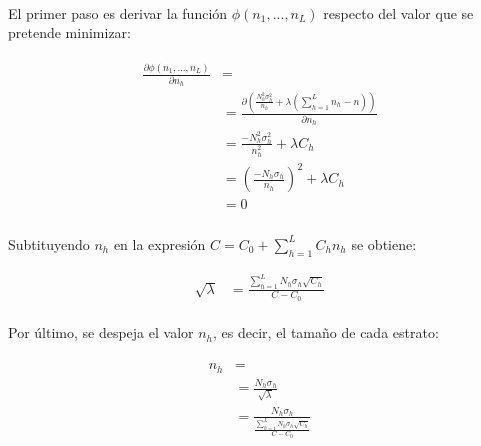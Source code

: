 \documentclass{article}
\begin{document}
      \paragraph{}
      El primer paso es derivar la función $\phi(n_1, ..., n_L)$ respecto del valor que se pretende minimizar:

      \begin{align}
      \label{eq:derivate_2}
        \begin{split}
          \frac{\partial \phi(n_1, ..., n_L)}{\partial n_h} &= \\
          &= \frac{\partial\left( \frac{N_h^2 \sigma_h^{2}}{n_h}
          + \lambda \left( \sum_{h=1}^L n_h - n\right)\right) }{\partial n_h} \\
          &= \frac{-N_h^2 \sigma_h^{2}}{n_h^2} +\lambda C_h\\
          &= \left(\frac{-N_h \sigma_h}{n_h}\right)^2 +\lambda C_h \\
          &= 0
        \end{split}
      \end{align}

      \paragraph{}
      Subtituyendo $n_h$ en la expresión $C = C_0 + \sum_{h=1}^LC_hn_h$ se obtiene:

      \begin{align}
        \sqrt{\lambda} &= \frac{\sum_{h=1}^L N_h \sigma_h \sqrt{C_h} }{C - C_0}
      \end{align}

      \paragraph{}
      Por último, se despeja el valor $n_h$, es decir, el tamaño de cada estrato:

      \begin{align}
        \begin{split}
          n_h &= \\
          &= \frac{N_h \sigma_h}{\sqrt{\lambda}}\\
          &= \frac{N_h \sigma_h}{\frac{\sum_{h=1}^L N_h \sigma_h \sqrt{C_h} }{C - C_0}}
        \end{split}
      \end{align}



  \nocite{muest2017}
  \nocite{sarndal2003model}

  
  
\end{document}
